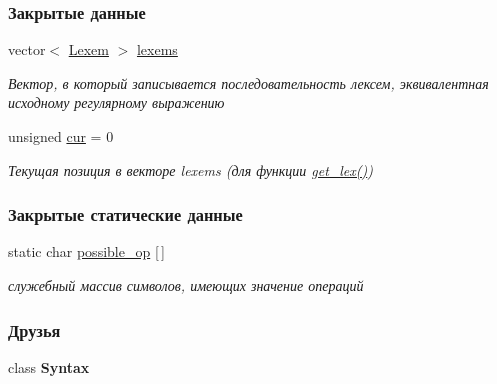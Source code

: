 \subsubsection*{Закрытые данные}
\begin{DoxyCompactItemize}
\item 
\hypertarget{class_lex_a1a29de7eb28089a8d88922fc06ad322d}{}vector$<$ \hyperlink{class_lexem}{Lexem} $>$ \hyperlink{class_lex_a1a29de7eb28089a8d88922fc06ad322d}{lexems}\label{class_lex_a1a29de7eb28089a8d88922fc06ad322d}

\begin{DoxyCompactList}\small\item\em Вектор, в который записывается последовательность лексем, эквивалентная исходному регулярному выражению \end{DoxyCompactList}\item 
\hypertarget{class_lex_ab6d830f1859bbb9a6d18ba0751f43255}{}unsigned \hyperlink{class_lex_ab6d830f1859bbb9a6d18ba0751f43255}{cur} = 0\label{class_lex_ab6d830f1859bbb9a6d18ba0751f43255}

\begin{DoxyCompactList}\small\item\em Текущая позиция в векторе lexems (для функции \hyperlink{class_lex_a38b6e95d1a98fd656ee932d34018a0aa}{get\+\_\+lex()}) \end{DoxyCompactList}\end{DoxyCompactItemize}
\subsubsection*{Закрытые статические данные}
\begin{DoxyCompactItemize}
\item 
static char \hyperlink{class_lex_ad87b6f7104bb60dee3cf0c196b5b46cd}{possible\+\_\+op} \mbox{[}$\,$\mbox{]}
\begin{DoxyCompactList}\small\item\em служебный массив символов, имеющих значение операций \end{DoxyCompactList}\end{DoxyCompactItemize}
\subsubsection*{Друзья}
\begin{DoxyCompactItemize}
\item 
\hypertarget{class_lex_a13fb68a36cac69480f7fd4b3900594f9}{}class {\bfseries Syntax}\label{class_lex_a13fb68a36cac69480f7fd4b3900594f9}

\end{DoxyCompactItemize}


